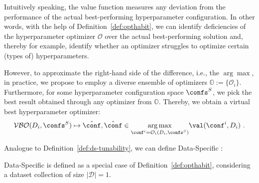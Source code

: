 Intuitively speaking, the value function measures any deviation from the performance of the actual best-performing hyperparameter configuration. In other words, with the help of Definition~\ref{def:opthabit}, we can identify deficiencies of the hyperparameter optimizer $\mathcal{O}$ over the actual best-performing solution and, thereby for example, identify whether an optimizer struggles to optimize certain (types of) hyperparameters.

However, to approximate the right-hand side of the difference, i.e., the $\arg\max$, in practice, we propose to employ a diverse ensemble of optimizers $\mathbb{O}:= \{ \mathcal{O}_i \}$. Furthermore, for some hyperparameter configuration space $\confs^S$, we pick the best result obtained through any optimizer from $\mathbb{O}$. Thereby, we obtain a virtual best hyperparameter optimizer:
\[
\mathcal{VBO}(D_i, \confs^S) \mapsto \hat{\conf}, \hat{\conf} \in \underset{\conf^i = \mathcal{O}_i(D_i, \confs^S)}{\arg\max} \val(\conf^i, D_i) \,\, .
\]

Analogue to Definition~\ref{def:ds-tunability}, we can define Data-Specific \opthabit:
\begin{definition}\label{def:ds-opthabit} 
Data-Specific \opthabit is defined as a special case of Definition~\ref{def:opthabit}, considering a dataset collection of size $|\mathcal{D}| = 1$.
\end{definition}


